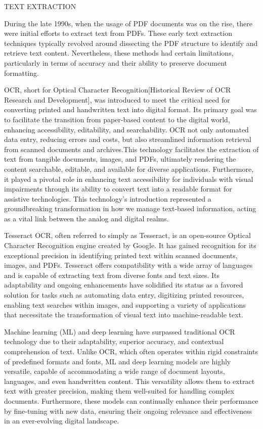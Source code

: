 \documentclass[conference]{IEEEtran}
\begin{document}
TEXT EXTRACTION

During the late 1990s, when the usage of PDF documents was on the rise, there were initial efforts to extract text from PDFs. These early text extraction techniques typically revolved around dissecting the PDF structure to identify and retrieve text content. Nevertheless, these methods had certain limitations, particularly in terms of accuracy and their ability to preserve document formatting.

OCR, short for Optical Character Recognition[Historical Review of OCR Research and Development], was introduced to meet the critical need for converting printed and handwritten text into digital format. Its primary goal was to facilitate the transition from paper-based content to the digital world, enhancing accessibility, editability, and searchability. OCR not only automated data entry, reducing errors and costs, but also streamlined information retrieval from scanned documents and archives.This technology facilitates the extraction of text from tangible documents, images, and PDFs, ultimately rendering the content searchable, editable, and available for diverse applications. Furthermore, it played a pivotal role in enhancing text accessibility for individuals with visual impairments through its ability to convert text into a readable format for assistive technologies. This technology's introduction represented a groundbreaking transformation in how we manage text-based information, acting as a vital link between the analog and digital realms.

Tesseract OCR, often referred to simply as Tesseract, is an open-source Optical Character Recognition engine created by Google. It has gained recognition for its exceptional precision in identifying printed text within scanned documents, images, and PDFs. Tesseract offers compatibility with a wide array of languages and is capable of extracting text from diverse fonts and text sizes. Its adaptability and ongoing enhancements have solidified its status as a favored solution for tasks such as automating data entry, digitizing printed resources, enabling text searches within images, and supporting a variety of applications that necessitate the transformation of visual text into machine-readable text.

Machine learning (ML) and deep learning have surpassed traditional OCR technology due to their adaptability, superior accuracy, and contextual comprehension of text. Unlike OCR, which often operates within rigid constraints of predefined formats and fonts, ML and deep learning models are highly versatile, capable of accommodating a wide range of document layouts, languages, and even handwritten content. This versatility allows them to extract text with greater precision, making them well-suited for handling complex documents. Furthermore, these models can continually enhance their performance by fine-tuning with new data, ensuring their ongoing relevance and effectiveness in an ever-evolving digital landscape.
\end{document}
